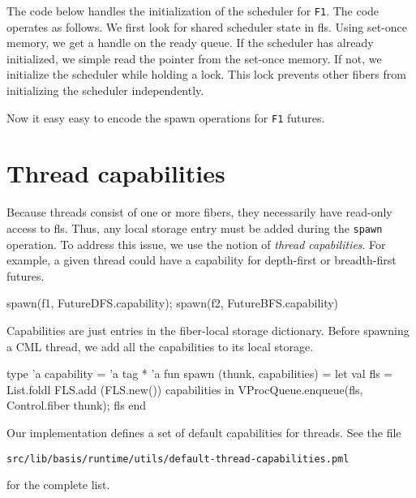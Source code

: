 \documentclass[11pt]{article}
\begin{document}
The code below handles the initialization of the scheduler for \texttt{F1}. The code operates as follows. We first look for shared scheduler state in fls. Using set-once memory, we get a handle on the ready queue. If the scheduler has already initialized, we simple read the pointer from the set-once memory. If not, we initialize the scheduler while holding a lock. This lock prevents other fibers from initializing the scheduler independently.


Now it easy easy to encode the spawn operations for \texttt{F1} futures.


\section{Thread capabilities}
Because threads consist of one or more fibers, they necessarily have read-only access to fls. Thus, any local storage entry must be added during the \texttt{spawn} operation. To address this issue, we use the notion of \emph{thread capabilities}. For example, a given thread could have a capability for depth-first or breadth-first futures.
\begin{centercode}
  spawn(f1, FutureDFS.capability);
  spawn(f2, FutureBFS.capability)
\end{centercode}

Capabilities are just entries in the fiber-local storage dictionary. Before spawning a CML thread, we add all the capabilities to its local storage.
\begin{centercode}
  type 'a capability = 'a tag * 'a
  fun spawn (thunk, capabilities) = let
        val fls = List.foldl FLS.add (FLS.new()) capabilities
        in
            VProcQueue.enqueue(fls, Control.fiber thunk);
            fls
        end
\end{centercode}

Our implementation defines a set of default capabilities for threads. See the file
\begin{center}
 \texttt{src/lib/basis/runtime/utils/default-thread-capabilities.pml} 
\end{center}
for the complete list.
\end{document}
